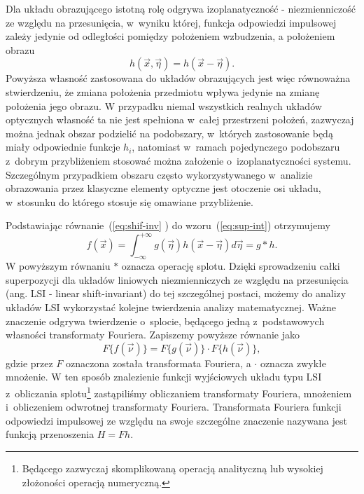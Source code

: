 Dla układu obrazującego istotną rolę odgrywa izoplanatyczność - niezmienniczość ze względu na przesunięcia, w~wyniku której, funkcja odpowiedzi impulsowej zależy jedynie od odległości pomiędzy położeniem wzbudzenia, a położeniem obrazu
\begin{equation}
h(\vec{x},\vec{\eta})=h(\vec{x}-\vec{\eta}).
\label{eq:shif-inv}
\end{equation}
Powyższa własność zastosowana do układów obrazujących jest więc równoważna stwierdzeniu, że zmiana położenia przedmiotu wpływa jedynie na zmianę położenia jego obrazu. W przypadku niemal wszystkich realnych układów optycznych własność ta nie jest spełniona w~całej przestrzeni położeń, zazwyczaj można jednak obszar podzielić na podobszary, w~których zastosowanie będą miały odpowiednie funkcje $h_i$, natomiast w~ramach pojedynczego podobszaru z~dobrym przybliżeniem stosować można założenie o~izoplanatyczności systemu. Szczególnym przypadkiem obszaru często wykorzystywanego w~analizie obrazowania przez klasyczne elementy optyczne jest otoczenie osi układu, w~stosunku do którego stosuje się omawiane przybliżenie.

Podstawiając równanie~(\ref{eq:shif-inv} ) do wzoru~(\ref{eq:sup-int}) otrzymujemy
\begin{equation}
f(\vec{x})=\int_{-\infty}^{+\infty} g(\vec{\eta})  h(\vec{x}-\vec{\eta}) d \vec{\eta} = g \ast h.
\label{eq:splot}
\end{equation}
W powyższym równaniu $\ast$ oznacza operację splotu. Dzięki sprowadzeniu całki superpozycji dla układów liniowych niezmienniczych ze względu na przesunięcia (ang. LSI - linear shift-invariant) do tej szczególnej postaci, możemy do analizy układów LSI wykorzystać kolejne twierdzenia analizy matematycznej. Ważne znaczenie odgrywa twierdzenie o~splocie, będącego jedną z~podstawowych własności transformaty Fouriera. Zapiszemy powyższe równanie jako
\begin{equation}
F\{f(\vec{\nu})\} = F\{g(\vec{\nu})\} \cdot F\{h(\vec{\nu})\},
\label{eq:transfer-mult}
\end{equation}
gdzie przez $F$ oznaczona została transformata Fouriera, a $\cdot$ oznacza zwykłe mnożenie. W ten sposób znalezienie funkcji wyjściowych układu typu LSI z~obliczania splotu\footnote{Będącego zazwyczaj skomplikowaną operacją analityczną lub wysokiej złożoności operacją numeryczną.} zastąpiliśmy obliczaniem transformaty Fouriera, mnożeniem i~obliczeniem odwrotnej transformaty Fouriera. Transformata Fouriera funkcji odpowiedzi impulsowej ze względu na swoje szczególne znaczenie nazywana jest funkcją przenoszenia $H=F{h}$.

